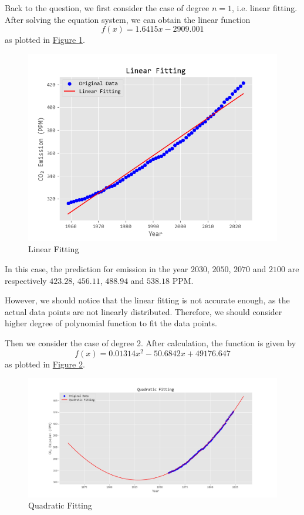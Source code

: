 \documentclass[12pt,a4paper]{article}
\begin{document}
    Back to the question, we first consider the case of degree $n=1$, i.e. linear fitting. After solving the equation system, we can obtain the linear function
    \begin{equation}
        f(x)=1.6415x-2909.001
    \end{equation}
    as plotted in \hyperref[linear_fitting]{Figure \ref*{linear_fitting}}.
    
    \begin{figure}[htbp]
        \centering
        \includegraphics[width=0.5\linewidth]{img/linear fitting.png}
        \caption{Linear Fitting}
        \label{linear_fitting}
    \end{figure}

    In this case, the prediction for  emission in the year $2030$, $2050$, $2070$ and $2100$ are respectively $423.28$, $456.11$, $488.94$ and $538.18$ PPM. 

    However, we should notice that the linear fitting is not accurate enough, as the actual data points are not linearly distributed. Therefore, we should consider higher degree of polynomial function to fit the data points.

    Then we consider the case of degree 2. After calculation, the function is given by
    \begin{equation}
        f(x)=0.01314x^2-50.6842x+49176.647
    \end{equation}
    as plotted in \hyperref[quadratic_fitting]{Figure \ref*{quadratic_fitting}}.

    \begin{figure}[htbp]
        \centering
        \includegraphics[width=1\linewidth]{img/quadratic fitting.png}
        \caption{Quadratic Fitting}
        \label{quadratic_fitting}
    \end{figure}
    
\end{document}
